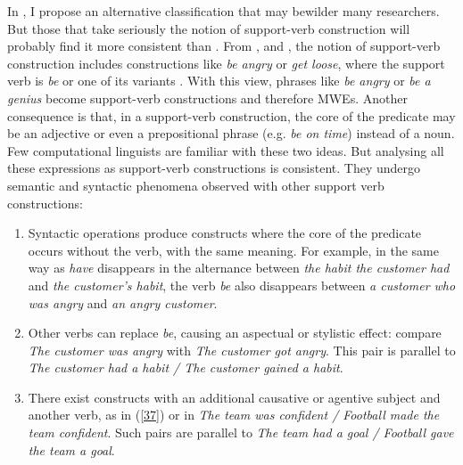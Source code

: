 \documentclass[output=paper]{langsci/langscibook}
\begin{document}
In , I propose an alternative classification that may bewilder many researchers. But those that take seriously the notion of support-verb construction will probably find it more consistent than . From \citet[34]{Gross1981}, \citet{Ranchhod1983} and \citet{Cattell1984}, the notion of support-verb construction includes constructions like \textit{be angry} or \textit{get loose}, where the support verb is \textit{be} or one of its variants \citep[123]{Meyers2007}. With this view, phrases like \textit{be angry} or \textit{be a genius} become support-verb constructions and therefore MWEs. Another consequence is that, in a support-verb construction, the core of the predicate may be an adjective or even a prepositional phrase (e.g. \textit{be on time}) instead of a noun. Few computational linguists are familiar with these two ideas. But analysing all these expressions as support-verb constructions is consistent. They undergo semantic and syntactic phenomena observed with other support verb constructions:

\renewcommand{\theenumi}{(\roman{enumi})}%
\begin{enumerate}
\item Syntactic operations 
produce constructs where the core of the predicate occurs without the verb, with the same meaning. For example, in the same way as \textit{have} disappears in the alternance between \textit{the habit the customer had} and \textit{the customer's habit}, the verb \textit{be} also disappears between \textit{a customer who was angry} and \textit{an angry customer}.

\item Other verbs can replace \textit{be}, causing an aspectual or stylistic effect: compare \textit{The customer was angry} with \textit{The customer got angry}. This pair is parallel to \textit{The customer had a habit / The customer gained a habit}.

\item There exist constructs with an additional causative or agentive subject and another verb, as in (\ref{37}) or in \textit{The team was confident / Football made the team confident}. Such pairs are parallel to \textit{The team had a goal / Football gave the team a goal}.
\end{enumerate}
\end{document}
